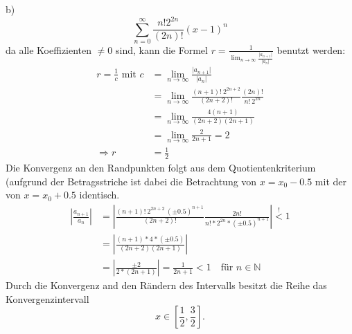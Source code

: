 \documentclass[a4paper]{article}
\begin{document}
\newpage
\setlength{\headheight}{0cm}
\par{b)}
\[
	\sum_{n=0}^\infty \frac{n! 2^{2n}}{(2n)!} (x - 1)^n
\]
da alle Koeffizienten $\neq 0$ sind, kann die Formel 
$r = \frac 1 {\lim_{n\rightarrow\infty} \frac{\vert a_{n+1} \vert}{\vert a_n \vert}} $ benutzt werden:
\begin{align*}
	r = \frac 1 c 
	\text{ mit }c &= \lim_{n\rightarrow\infty} 
	\frac{\vert a_{n+1} \vert}{\vert a_n\vert} \\
	&= \lim_{n\rightarrow\infty}
	\frac{(n+1)! \ 2^{2n+2}}{(2n+2)!}
	\frac{(2n)!}{n! \ 2^{2n}} \\
	&= \lim_{n\rightarrow\infty}
	\frac{4 (n+1)}{(2n+2)(2n+1)} \\
	&= \lim_{n\rightarrow\infty}
	\frac{2}{2n+1}
	=
	2 \\
	\Rightarrow r &= \frac{1}{2}
\end{align*}
Die Konvergenz an den Randpunkten folgt aus dem Quotientenkriterium 
(aufgrund der Betragsstriche ist dabei die Betrachtung von 
$x = x_0 - 0.5$ mit der von $x = x_0 + 0.5$ identisch.
\begin{align*}
	\left|
	\frac{a_{n+1}}{a_n}\right| 
	&= \left|
	\frac{(n+1)! \ 2^{2n+2} \ (\pm0.5)^{n+1}}{(2n+2)!} 
	\frac{2n!}{n! * 2^{2n} * (\pm0.5)^{n+1}}
	\right| 
	\overset ! < 1
	\\ 
	&= \left|
	\frac{(n+1) * 4 * (\pm0.5)}{(2n+2)(2n+1)}
	\right| \\
	&= \left|
	\frac{\pm2}{2*(2n+1)} 
	\right| = \frac 1 {2n + 1} < 1 \quad
	\text{für } n \in \mathbb{N}
\end{align*}
Durch die Konvergenz and den Rändern des Intervalls besitzt die Reihe das Konvergenzintervall 
\[ x \in \left[\frac12, \frac32 \right]. \]
\end{document}
